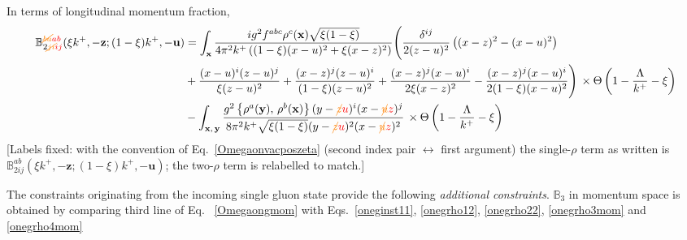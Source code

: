 \documentclass[aps,prd,amsmath,amssymb,nofootinbib]{revtex4-2}
\def\mf#1{\mathbb{#1}}
\def\v#1{\mathbf{#1}}
\numberwithin{equation}{section}
\begin{document}
In terms of longitudinal momentum fraction,
\begin{align}
     \mf{B}^{{\color{orange}\cancel{ba}}{\color{red}ab}}_{2{\color{orange}\cancel{ji}}{\color{red}ij}}(\xi k^{+}, -\v{z}; (1-\xi)k^{+}, -\v{u}) & = \int_{\mathbf{x}}\frac{ig^{2}f^{abc}\rho^{c}(\mathbf{x})\sqrt{\xi(1-\xi)}}{4\pi^{2}k^{+}\left((1-\xi)(x-u)^{2}+\xi (x-z)^{2}\right)}\Bigg(\frac{\delta^{ij}}{2(z-u)^{2}}\left((x-z)^{2}-(x-u)^{2}\right)\notag \\ & +\frac{(x-u)^{i}(z-u)^{j}}{\xi (z-u)^{2}}+\frac{(x-z)^{j}(z-u)^{i}}{(1-\xi)(z-u)^{2}}+\frac{(x-z)^{j}(x-u)^{i}}{2\xi (x-z)^{2}} -\frac{(x-z)^{j}(x-u)^{i}}{2(1-\xi)(x-u)^{2}}\Bigg)\,\times\Theta\left(1-\frac{\Lambda}{k^{+}}-\xi\right)\notag \\ & -\int_{\mathbf{x},\,\mathbf{y}}\frac{g^{2}\left\{ \rho^{a}(\mathbf{y}),\,\rho^{b}(\mathbf{x})\right\} (y-{\color{orange}\cancel{z}}{\color{red}u})^{i}(x-{\color{orange}\cancel{u}}{\color{red}z})^{j}}{8\pi^{2}k^{+}\sqrt{\xi(1-\xi)}(y-{\color{orange}\cancel{z}}{\color{red}u})^{2}(x-{\color{orange}\cancel{u}}{\color{red}z})^{2}}\,\times\Theta\left(1-\frac{\Lambda}{k^{+}}-\xi\right)
\end{align} {\color{red}[Labels fixed: with the convention of Eq.~\eqref{Omegaonvacposzeta} (second index pair $\leftrightarrow$ first argument) the single-$\rho$ term as written is $\mf{B}^{ab}_{2ij}(\xi k^+,-\v{z};(1-\xi)k^+,-\v{u})$; the two-$\rho$ term is relabelled to match.]}\par\noindent 
The constraints originating from the incoming single gluon state provide the following {\it additional constraints}. $\mf{B}_{3}$ in momentum space is obtained by comparing third line of Eq.~ \eqref{Omegaongmom} with Eqs.~\eqref{oneginst11}, \eqref{onegrho12}, \eqref{onegrho22}, \eqref{onegrho3mom} and \eqref{onegrho4mom} 
\end{document}

